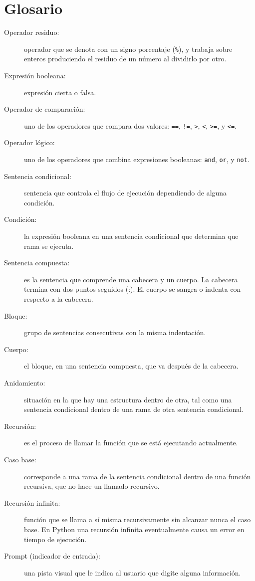 \section{Glosario}
\begin{description}
\item [{Operador residuo:}] operador que se denota con un signo porcentaje
(\texttt{\%}), y trabaja sobre enteros produciendo el residuo de un
número al dividirlo por otro.
\item [{Expresión booleana:}] expresión cierta o falsa.
\item [{Operador de comparación:}] uno de los operadores que compara
dos valores: \texttt{==}, \texttt{!=}, \texttt{\textgreater{}}, \texttt{\textless{}},
\texttt{\textgreater{}=}, y \texttt{\textless{}=}.
\item [{Operador lógico:}] uno de los operadores que combina expresiones
booleanas: \texttt{and}, \texttt{or}, y \texttt{not}.
\item [{Sentencia condicional:}] sentencia que controla el flujo de ejecución
dependiendo de alguna condición.
\item [{Condición:}] la expresión booleana en una sentencia condicional
que determina que rama se ejecuta.
\item [{Sentencia compuesta:}] es la sentencia que comprende una cabecera
y un cuerpo. La cabecera termina con dos puntos seguidos (:). El cuerpo
se sangra o indenta con respecto a la cabecera.
\item [{Bloque:}] grupo de sentencias consecutivas con la misma indentación.
\item [{Cuerpo:}] el bloque, en una sentencia compuesta, que va después
de la cabecera.
\item [{Anidamiento:}] situación en la que hay una estructura dentro de
otra, tal como una sentencia condicional dentro de una rama de otra
sentencia condicional.
\item [{Recursión:}] es el proceso de llamar la función que se está ejecutando
actualmente.
\item [{Caso base:}] corresponde a una rama de la sentencia condicional
dentro de una función recursiva, que no hace un llamado recursivo.
\item [{Recursión infinita:}] función que se llama a sí misma recursivamente
sin alcanzar nunca el caso base. En Python una recursión infinita
eventualmente causa un error en tiempo de ejecución.
\item [{Prompt (indicador de entrada):}] una pista visual que le indica
al usuario que digite alguna información.

  
  
   
   
\end{description}

